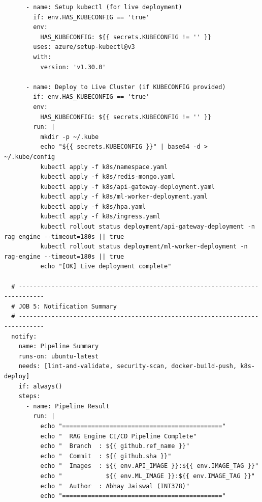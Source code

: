 \documentclass[12pt,a4paper]{report}
\begin{document}
\begin{lstlisting}
      - name: Setup kubectl (for live deployment)
        if: env.HAS_KUBECONFIG == 'true'
        env:
          HAS_KUBECONFIG: ${{ secrets.KUBECONFIG != '' }}
        uses: azure/setup-kubectl@v3
        with:
          version: 'v1.30.0'

      - name: Deploy to Live Cluster (if KUBECONFIG provided)
        if: env.HAS_KUBECONFIG == 'true'
        env:
          HAS_KUBECONFIG: ${{ secrets.KUBECONFIG != '' }}
        run: |
          mkdir -p ~/.kube
          echo "${{ secrets.KUBECONFIG }}" | base64 -d > ~/.kube/config
          kubectl apply -f k8s/namespace.yaml
          kubectl apply -f k8s/redis-mongo.yaml
          kubectl apply -f k8s/api-gateway-deployment.yaml
          kubectl apply -f k8s/ml-worker-deployment.yaml
          kubectl apply -f k8s/hpa.yaml
          kubectl apply -f k8s/ingress.yaml
          kubectl rollout status deployment/api-gateway-deployment -n rag-engine --timeout=180s || true
          kubectl rollout status deployment/ml-worker-deployment -n rag-engine --timeout=180s || true
          echo "[OK] Live deployment complete"

  # -----------------------------------------------------------------------------
  # JOB 5: Notification Summary
  # -----------------------------------------------------------------------------
  notify:
    name: Pipeline Summary
    runs-on: ubuntu-latest
    needs: [lint-and-validate, security-scan, docker-build-push, k8s-deploy]
    if: always()
    steps:
      - name: Pipeline Result
        run: |
          echo "============================================"
          echo "  RAG Engine CI/CD Pipeline Complete"
          echo "  Branch  : ${{ github.ref_name }}"
          echo "  Commit  : ${{ github.sha }}"
          echo "  Images  : ${{ env.API_IMAGE }}:${{ env.IMAGE_TAG }}"
          echo "            ${{ env.ML_IMAGE }}:${{ env.IMAGE_TAG }}"
          echo "  Author  : Abhay Jaiswal (INT378)"
          echo "============================================"
\end{lstlisting}
\end{document}
